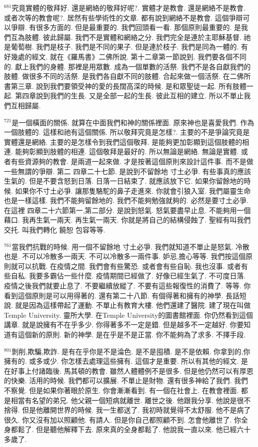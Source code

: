 \documentclass{book}
\begin{document}
$^{681}$究竟實體的敬拜好.
還是網絡的敬拜好呢?.
實體才是教會.
還是網絡不是教會.
或者次等的教會呢?.
居然有些學術性的文章.
都有說到網絡不是教會.
這個爭辯可以爭辯.
有很多方面的.
但是最重要的.
我們回頭看一看.
那個原則最重要的.
是我們互為肢體.
彼此歸屬.
我們不是實體和網絡之分.
我們完全是連於主耶穌基督.
祂是葡萄樹.
我們是枝子.
我們是不同的果子.
但是連於枝子.
我們是同為一體的.
有好幾處的經文.
就在《羅馬書》二佛所說.
第十二章第一節說到.
我們要各個不同的.
獻上我們的身體.
那裡是用眾數.
成為一個單數的活祭.
我們不是各自獻我們的肢體.
做很多不同的活祭.
是我們各自獻不同的肢體.
合起來做一個活祭.
在二佛所書第三章.
說到我們要領受神的愛的長闊高深的時候.
是和眾聖徒一起.
所有肢體一起.
第四章說到我們的生長.
又是全部一起的生長.
彼此互相的建立.
所以不單止我們互相歸屬.

$^{721}$是一個橫面的關係.
就算在中面我們和神的關係裡面.
原來神也是喜愛我們.
作為一個肢體的.
這樣和祂有這個關係.
所以敬拜究竟是怎樣?.
主要的不是爭論究竟是實體還是網絡.
主要的是怎樣令到我們這個敬拜.
是能夠更加彰顯到這個肢體的相連.
能夠彰顯到肢體的相連.
這個敬拜是最好的.
所以無論是網絡.
無論是實體.
或者有些資源夠的教會.
是兩道一起來做.
才是按著這個原則來設計這件事.
而不是做一些無謂的爭辯.
第二 四章二十七節.
是說到不留餘地 寸土必爭.
有些事真的應該生氣的.
但是不要含怒到日落.
日落一日結束了.
就應該放下它.
如果你留餘地的時候.
如果你不寸土必爭.
讓那隻駱駝的鼻子走進來.
你就會引狼入室.
我們屬靈生命也是一樣這樣.
我們不能夠留餘地的.
我們不能夠勉強就夠的.
必然是要寸土必爭.
在這裡 四章二十六節第一,第二部分.
是說到怒氣.
怒氣要盡早止息.
不能夠用一個藉口.
我再生氣一兩天.
再生氣一兩天.
你就是將自己的結構侵蝕了.
聖經有叫我們交托.
叫我們轉化 饒恕 包容等等.

$^{761}$當我們抗戰的時候.
用一個不留餘地 寸土必爭.
我們就知道不單止是怒氣.
冷散也是.
不可以冷散多一兩天.
不可以冷散多一兩件事.
妒忌,擔心等等.
我們按這個原則就可以抗戰.
在疫情之間.
我們會有些驚恐.
或者會有些自恥.
我也沒事.
或者有些自私.
我要多霸佔一些什麼.
疫情期間已經做了.
好像已經生氣了.
不可度日落.
疫情之後我們就要止息了.
不要繼續放縱了.
不要有這些報復性的消費了.
等等.
你看到這個原則是可以用得著的.
還有第二十八節.
有個得著和擁有的神學.
長話短說.
就是因為這樣帶起了運動.
不單止有教育大樓.
他們還建了醫院.
建了現在叫做Temple University.
靈所大學.
在Temple University的圖書館裡面.
你仍然看到這個講章.
就是說擁有不在乎多少.
你得著多不一定是錯.
但是越多不一定越好.
你要知道有這個新的原則.
新的神學.
是在乎是不是正當.
你不能夠為了求多.
不擇手段.

$^{801}$剝削,欺騙,欺詐.
是有在乎你是不是淪色.
是不是囤積.
是不是依賴.
你拿到的,你擁有的.
或多或少.
你怎樣去處理這些擁有.
這個才是重要.
所以有其他的經文.
是在好事上付諸臨後.
馬其頓的教會.
雖然人體體例不是很多.
但是他仍然可以有厚恩的快樂.
活用的時候.
我們都可以擴展.
不單止是財物.
還有很多神給了我們.
我們不察覺.
但是如果你著眼於原生.
你會漸漸看到.
有一個在社會上.
在教會裡面.
都是相當有名望的弟兄.
他父親一個短病就離世.
離世之後.
他跟我分享.
他說是很不捨得.
但是他離開世界的時候.
我一生都送了.
我初時就覺得不太舒服.
他不是病了很久.
你又沒有加以照顧他.
有請人.
但是你自己都照顧不到.
怎會他離世了.
你全身都鬆了.
但是聽他解釋下去.
原來真的全身都鬆了.
他說我一直以來.
他已經六十多歲了.
\end{document}
